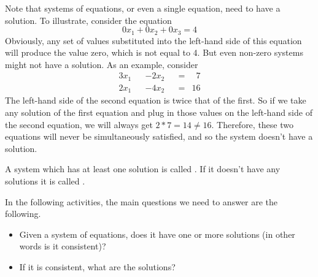 \documentclass{ximera}
\begin{document}
\begin{example}
  Note that systems of equations, or even a single equation, need to have a solution. To illustrate, consider the equation
  \[
    0x_1 + 0x_2 + 0x_3 = 4
  \]
  Obviously, any set of values substituted into the left-hand side of
  this equation will produce the value zero, which is not equal to
  4. But even non-zero systems might not have a solution. As an
  example, consider
  \begin{alignat*}{3}
    x_1 && - 2x_2 && =& \phantom{1}7 \\
    2x_1 && - 4x_2 && =& 16 
  \end{alignat*}
  The left-hand side of the second equation is twice that of the first. So if we take any solution of the first equation and plug in those values on the left-hand side of the second equation, we will always get $2*7 = 14\ne 16$. Therefore, these two equations will never be simultaneously satisfied, and so the system doesn't have a solution.
\end{example}

\begin{definition}
A system which has at least one solution is called . If it doesn't have any solutions it is called .
\end{definition}

In the following activities, the main questions we need to answer are the following.
\begin{itemize}
\item Given a system of equations, does it have one or more solutions (in other words is it consistent)?
\item If it is consistent, what are the solutions?
\end{itemize}
\end{document}
